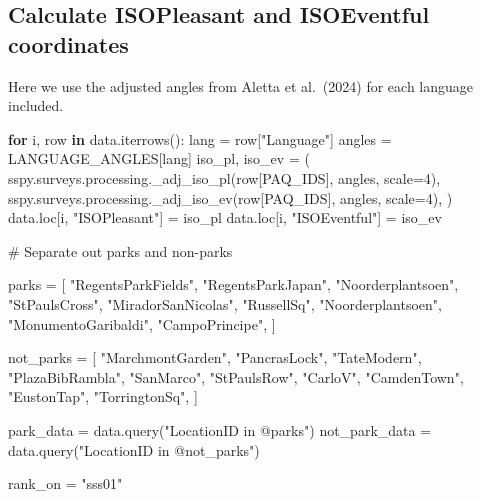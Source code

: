 \documentclass[
  letterpaper,
  DIV=11,
  numbers=noendperiod]{scrartcl}
\newenvironment{Shaded}{\begin{snugshade}}{\end{snugshade}}
\newcommand{\CommentTok}[1]{\textcolor[rgb]{0.37,0.37,0.37}{#1}}
\newcommand{\ControlFlowTok}[1]{\textcolor[rgb]{0.00,0.23,0.31}{\textbf{#1}}}
\newcommand{\DecValTok}[1]{\textcolor[rgb]{0.68,0.00,0.00}{#1}}
\newcommand{\KeywordTok}[1]{\textcolor[rgb]{0.00,0.23,0.31}{\textbf{#1}}}
\newcommand{\NormalTok}[1]{\textcolor[rgb]{0.00,0.23,0.31}{#1}}
\newcommand{\OperatorTok}[1]{\textcolor[rgb]{0.37,0.37,0.37}{#1}}
\newcommand{\StringTok}[1]{\textcolor[rgb]{0.13,0.47,0.30}{#1}}
\begin{document}
\subsection{Calculate ISOPleasant and ISOEventful
coordinates}\label{calculate-isopleasant-and-isoeventful-coordinates}

Here we use the adjusted angles from Aletta et al.~(2024) for each
language included.

\begin{Shaded}
\begin{Highlighting}[]
\ControlFlowTok{for}\NormalTok{ i, row }\KeywordTok{in}\NormalTok{ data.iterrows():}
\NormalTok{    lang }\OperatorTok{=}\NormalTok{ row[}\StringTok{"Language"}\NormalTok{]}
\NormalTok{    angles }\OperatorTok{=}\NormalTok{ LANGUAGE\_ANGLES[lang]}
\NormalTok{    iso\_pl, iso\_ev }\OperatorTok{=}\NormalTok{ (}
\NormalTok{        sspy.surveys.processing.\_adj\_iso\_pl(row[PAQ\_IDS], angles, scale}\OperatorTok{=}\DecValTok{4}\NormalTok{),}
\NormalTok{        sspy.surveys.processing.\_adj\_iso\_ev(row[PAQ\_IDS], angles, scale}\OperatorTok{=}\DecValTok{4}\NormalTok{),}
\NormalTok{    )}
\NormalTok{    data.loc[i, }\StringTok{"ISOPleasant"}\NormalTok{] }\OperatorTok{=}\NormalTok{ iso\_pl}
\NormalTok{    data.loc[i, }\StringTok{"ISOEventful"}\NormalTok{] }\OperatorTok{=}\NormalTok{ iso\_ev}
\end{Highlighting}
\end{Shaded}

\begin{Shaded}
\begin{Highlighting}[]
\CommentTok{\# Separate out parks and non{-}parks}

\NormalTok{parks }\OperatorTok{=}\NormalTok{ [}
    \StringTok{"RegentsParkFields"}\NormalTok{,}
    \StringTok{"RegentsParkJapan"}\NormalTok{,}
    \StringTok{"Noorderplantsoen"}\NormalTok{,}
    \StringTok{"StPaulsCross"}\NormalTok{,}
    \StringTok{"MiradorSanNicolas"}\NormalTok{,}
    \StringTok{"RussellSq"}\NormalTok{,}
    \StringTok{"Noorderplantsoen"}\NormalTok{,}
    \StringTok{"MonumentoGaribaldi"}\NormalTok{,}
    \StringTok{"CampoPrincipe"}\NormalTok{,}
\NormalTok{]}

\NormalTok{not\_parks }\OperatorTok{=}\NormalTok{ [}
    \StringTok{"MarchmontGarden"}\NormalTok{,}
    \StringTok{"PancrasLock"}\NormalTok{,}
    \StringTok{"TateModern"}\NormalTok{,}
    \StringTok{"PlazaBibRambla"}\NormalTok{,}
    \StringTok{"SanMarco"}\NormalTok{,}
    \StringTok{"StPaulsRow"}\NormalTok{,}
    \StringTok{"CarloV"}\NormalTok{,}
    \StringTok{"CamdenTown"}\NormalTok{,}
    \StringTok{"EustonTap"}\NormalTok{,}
    \StringTok{"TorringtonSq"}\NormalTok{,}
\NormalTok{]}

\NormalTok{park\_data }\OperatorTok{=}\NormalTok{ data.query(}\StringTok{"LocationID in @parks"}\NormalTok{)}
\NormalTok{not\_park\_data }\OperatorTok{=}\NormalTok{ data.query(}\StringTok{"LocationID in @not\_parks"}\NormalTok{)}

\NormalTok{rank\_on }\OperatorTok{=} \StringTok{"sss01"}
\end{Highlighting}
\end{Shaded}
\end{document}
